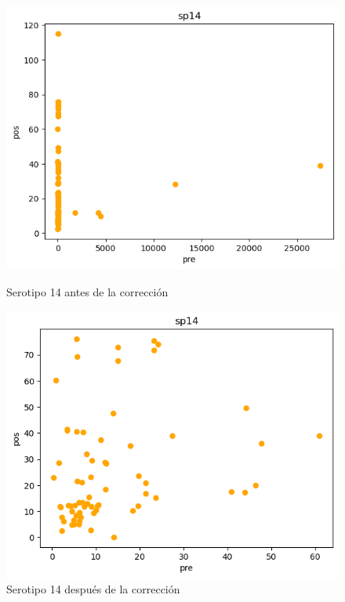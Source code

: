 \begin{figure}[H]
    \begin{minipage}{0.45\textwidth}
        \centering
        \includegraphics[width=\linewidth]{Graphics/sp14d.png}
        \caption{Serotipo 14 antes de la corrección}
        \label{fig:sp14d}
    \end{minipage}%
    \hfill
    \begin{minipage}{0.45\textwidth}
        \centering
        \includegraphics[width=\linewidth]{Graphics/sp14.png}
        \caption{Serotipo 14 después de la corrección}
        \label{fig:sp14}
    \end{minipage}
\end{figure}


